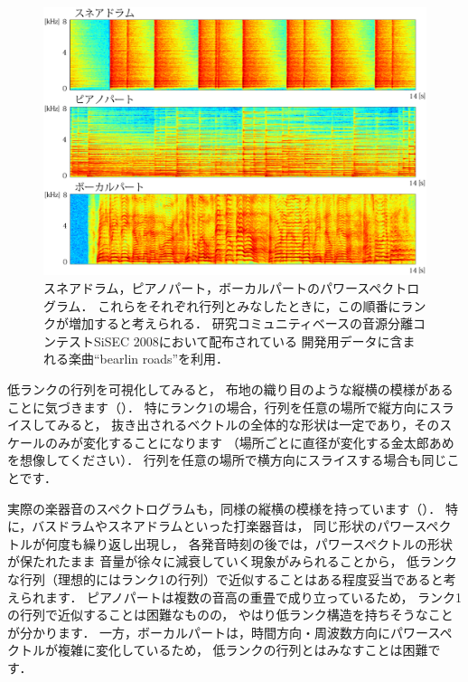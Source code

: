 \begin{figure}[t]
\centering
\includegraphics[width=.99\linewidth]{sections/music/low_rank_spectrograms}
\caption{スネアドラム，ピアノパート，ボーカルパートのパワースペクトログラム．
これらをそれぞれ行列とみなしたときに，この順番にランクが増加すると考えられる．
研究コミュニティベースの音源分離コンテストSiSEC 2008\cite{vincent:sisec:2008}において配布されている
開発用データに含まれる楽曲``bearlin roads''を利用．}
\label{fig:low_rank_spectrograms}
\end{figure}

低ランクの行列を可視化してみると，
布地の織り目のような縦横の模様があることに気づきます（）．
特にランク1の場合，行列を任意の場所で縦方向にスライスしてみると，
抜き出されるベクトルの全体的な形状は一定であり，そのスケールのみが変化することになります
（場所ごとに直径が変化する金太郎あめを想像してください）．
行列を任意の場所で横方向にスライスする場合も同じことです．

実際の楽器音のスペクトログラムも，同様の縦横の模様を持っています（）．
特に，バスドラムやスネアドラムといった打楽器音は，
同じ形状のパワースペクトルが何度も繰り返し出現し，
各発音時刻の後では，パワースペクトルの形状が保たれたまま
音量が徐々に減衰していく現象がみられることから，
低ランクな行列（理想的にはランク1の行列）で近似することはある程度妥当であると考えられます．
ピアノパートは複数の音高の重畳で成り立っているため，
ランク1の行列で近似することは困難なものの，
やはり低ランク構造を持ちそうなことが分かります．
一方，ボーカルパートは，時間方向・周波数方向にパワースペクトルが複雑に変化しているため，
低ランクの行列とはみなすことは困難です．


